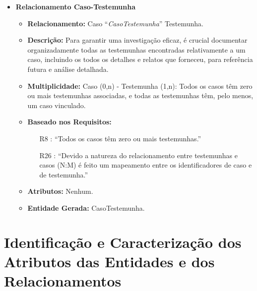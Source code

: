 \documentclass[a4paper,12pt]{scrreprt}
\begin{document}
\begin{itemize}
        \item\textbf{Relacionamento Caso-Testemunha}
        \begin{itemize}
            \item\textbf{Relacionamento:} Caso “\textit{CasoTestemunha}” Testemunha.
            \item\textbf{Descrição:} Para garantir uma investigação eficaz, é crucial documentar organizadamente todas as testemunhas encontradas relativamente a um caso, incluindo os todos os detalhes e relatos que forneceu, para referência futura e análise detalhada.
            \item\textbf{Multiplicidade:} Caso (0,n) - Testemunha (1,n): Todos os casos têm zero ou mais testemunhas associadas, e todas as testemunhas têm, pelo menos, um caso vinculado.
            \item\textbf{Baseado nos Requisitos:}
            \begin{itemize}
                \item [R8]: “Todos os casos têm zero ou mais testemunhas.”
                \item [R26]: “Devido a natureza do relacionamento entre testemunhas e casos (N:M) é feito um mapeamento entre os identificadores de caso e de testemunha.”
            \end{itemize}
            \item\textbf{Atributos:} Nenhum.
            \item\textbf{Entidade Gerada:} CasoTestemunha.
        \end{itemize}
        \end{itemize}

    \clearpage
    \section{Identificação e Caracterização dos Atributos das Entidades e dos Relacionamentos}
        
\end{document}
